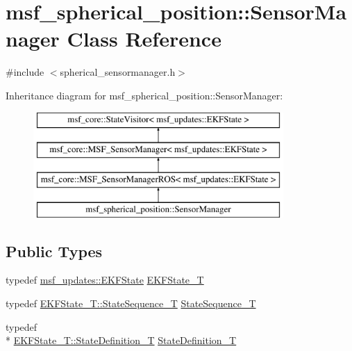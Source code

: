 \hypertarget{classmsf__spherical__position_1_1SensorManager}{\section{msf\-\_\-spherical\-\_\-position\-:\-:Sensor\-Manager Class Reference}
\label{classmsf__spherical__position_1_1SensorManager}
}


{\ttfamily \#include $<$spherical\-\_\-sensormanager.\-h$>$}

Inheritance diagram for msf\-\_\-spherical\-\_\-position\-:\-:Sensor\-Manager\-:\begin{figure}[H]
\begin{center}
\leavevmode
\includegraphics[height=4.000000cm]{classmsf__spherical__position_1_1SensorManager}
\end{center}
\end{figure}
\subsection*{Public Types}
\begin{DoxyCompactItemize}
\item 
typedef \hyperlink{namespacemsf__updates_a03b0801c76b7400623b00ad4d28f9bcc}{msf\-\_\-updates\-::\-E\-K\-F\-State} \hyperlink{classmsf__spherical__position_1_1SensorManager_afd0df05266caa980a03e98b0d9fd1fef}{E\-K\-F\-State\-\_\-\-T}
\item 
typedef \hyperlink{structmsf__core_1_1GenericState__T_a75fe70f7c7517dbf7d4c91b75b08a1dd}{E\-K\-F\-State\-\_\-\-T\-::\-State\-Sequence\-\_\-\-T} \hyperlink{classmsf__spherical__position_1_1SensorManager_ab469830abecc321e5584edfd2b861efd}{State\-Sequence\-\_\-\-T}
\item 
typedef \\*
\hyperlink{structmsf__core_1_1GenericState__T_a9a7d65b0325658ab07b81960a3ed4604}{E\-K\-F\-State\-\_\-\-T\-::\-State\-Definition\-\_\-\-T} \hyperlink{classmsf__spherical__position_1_1SensorManager_a35ea7ee1f9f05c2d0d5a629348ce9f97}{State\-Definition\-\_\-\-T}
\end{DoxyCompactItemize}
